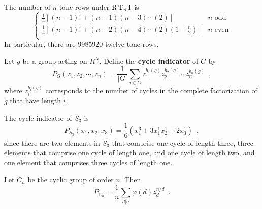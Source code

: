 \begin{corollary}
	\cite[54]{Reiner1985}
	\cite[127]{FripertingerLackner2015}
	The number of $n$-tone rows under $\operatorname{R} \operatorname{T}_n \operatorname{I}$ is
	\begin{equation}
		\begin{cases}
			\frac{1}{4} \left[ (n - 1)! + (n - 1) (n - 3) \cdots (2) \right]
			& n \text{ odd} \\
			\frac{1}{4} \left[ (n - 1)! + (n - 2) (n - 4) \cdots (2) (1 + \frac{n}{2})
			\right] & n \text{ even} \\
		\end{cases}
	\end{equation}
	In particular, there are 9985920 twelve-tone rows.
\end{corollary}

\begin{definition}
	\cite[87]{Aigner2007}
	Let $g$ be a group acting on $R^N$. Define the \textbf{cycle indicator} of $G$ by
	\begin{equation}
		P_G(z_1, z_2, \cdots, z_n) = \frac{1}{|G|} \sum_{g \in G} z_1^{b_1(g)} z_2^{b_2(g)}
		\cdots z_n^{b_n(g)} \enspace,
	\end{equation}
	where $z_i^{b_i(g)}$ corresponds to the number of cycles in the complete factorization
	of $g$ that have length $i$.
\end{definition}

\begin{example}
	The cycle indicator of $S_3$ is
	\begin{equation}
		P_{S_3}(x_1, x_2, x_3) = \frac{1}{6}(x_1^3 + 3 x_1^1 x_2^1 + 2 x_3^1) \enspace,
	\end{equation}
	since there are two elements in $S_3$ that comprise one cycle of length three,
	three elements that comprise one cycle of length one, and one cycle of length two,
	and one element that comprises three cycles of length one.
\end{example}

\begin{example}
	Let $C_n$ be the cyclic group of order $n$. Then
	\begin{equation}
		P_{C_n} = \frac{1}{n} \sum_{d | n} \varphi(d) z_d^{n / d} \enspace.
	\end{equation}
\end{example}


